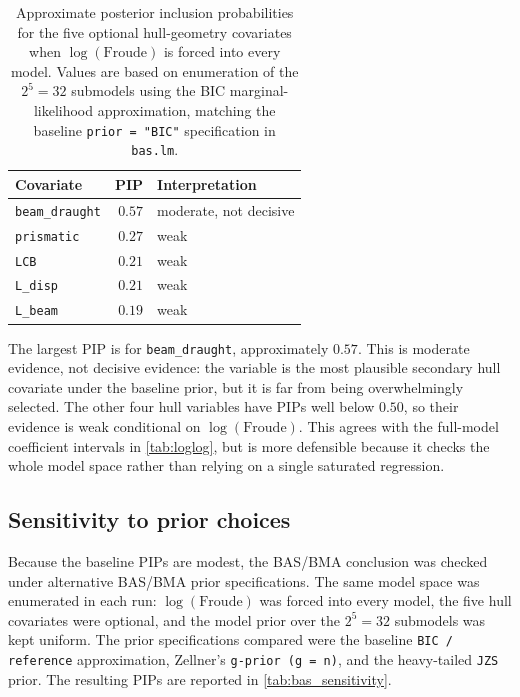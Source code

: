 \documentclass[12pt,a4paper]{article}
\begin{document}
\begin{table}[H]
	\centering
	\caption{Approximate posterior inclusion probabilities for the five optional hull-geometry covariates when $\log(\mathrm{Froude})$ is forced into every model. Values are based on enumeration of the $2^5=32$ submodels using the BIC marginal-likelihood approximation, matching the baseline \texttt{prior = "BIC"} specification in \texttt{bas.lm}.}
	\label{tab:bma_pip}
	\begin{tabular}{l r l}
		\toprule
		\textbf{Covariate}     & \textbf{PIP} & \textbf{Interpretation} \\
		\midrule
		\texttt{beam\_draught} & $0.57$       & moderate, not decisive  \\
		\texttt{prismatic}     & $0.27$       & weak                    \\
		\texttt{LCB}           & $0.21$       & weak                    \\
		\texttt{L\_disp}       & $0.21$       & weak                    \\
		\texttt{L\_beam}       & $0.19$       & weak                    \\
		\bottomrule
	\end{tabular}
\end{table}

The largest PIP is for \texttt{beam\_draught}, approximately $0.57$. This is
moderate evidence, not decisive evidence: the variable is the most plausible
secondary hull covariate under the baseline prior, but it is far from being
overwhelmingly selected. The other four hull variables have PIPs well below
$0.50$, so their evidence is weak conditional on $\log(\mathrm{Froude})$. This
agrees with the full-model coefficient intervals in \cref{tab:loglog}, but is
more defensible because it checks the whole model space rather than relying on a
single saturated regression.

\subsection{Sensitivity to prior choices}

Because the baseline PIPs are modest, the BAS/BMA conclusion was checked under
alternative BAS/BMA prior specifications. The same model space was enumerated in
each run: $\log(\mathrm{Froude})$ was forced into every model, the five hull
covariates were optional, and the model prior over the $2^5=32$ submodels was
kept uniform. The prior specifications compared were the baseline
\texttt{BIC / reference} approximation, Zellner's \texttt{g-prior (g = n)}, and
the heavy-tailed \texttt{JZS} prior. The resulting PIPs are reported in
\cref{tab:bas_sensitivity}.
\end{document}
